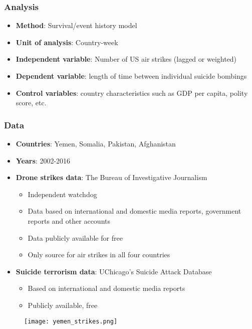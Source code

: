 \documentclass{beamer}
\begin{document}
  \begin{frame}
    \frametitle{Analysis}
    \begin{itemize}
	\item \textbf{Method}: Survival/event history model
	\item \textbf{Unit of analysis}: Country-week
        \item \textbf{Independent variable}: Number of US air strikes (lagged or weighted)
	\item \textbf{Dependent variable}: length of time between individual suicide bombings
	\item \textbf{Control variables}: country characteristics such as GDP per capita, polity score, etc. 
     \end{itemize}
  \end{frame}

  \begin{frame}
    \frametitle{Data}
    \begin{itemize}
	\item \textbf{Countries}: Yemen, Somalia, Pakistan, Afghanistan
	\item \textbf{Years}: 2002-2016
	\item \textbf{Drone strikes data}: The Bureau of Investigative Journalism
		\begin{itemize}
			\item Independent watchdog
			\item Data based on international and domestic media reports, government reports and other accounts
			\item Data publicly available for free
			\item Only source for air strikes in all four countries
		\end{itemize}
	\item \textbf{Suicide terrorism data}: UChicago's Suicide Attack Database
		\begin{itemize}
			\item Based on international and domestic media reports
			\item Publicly available, free
		\end{itemize}
     \end{itemize}
  \end{frame}

  \begin{frame}
	\begin{figure}[h!]
		\texttt{[image: yemen\_strikes.png]}
	\end{figure}
  \end{frame}
\end{document}
